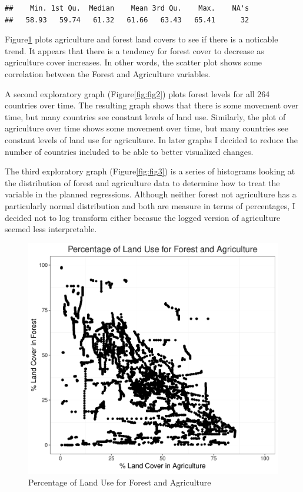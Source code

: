 \documentclass[12pt,]{article}
\begin{document}
\begin{verbatim}
##    Min. 1st Qu.  Median    Mean 3rd Qu.    Max.    NA's 
##   58.93   59.74   61.32   61.66   63.43   65.41      32
\end{verbatim}

Figure\ref{fig:fig1} plots agriculture and forest land covers to see if
there is a noticable trend. It appears that there is a tendency for
forest cover to decrease as agriculture cover increases. In other words,
the scatter plot shows some correlation between the Forest and
Agriculture variables.

A second exploratory graph (Figure\ref{fig:fig2}) plots forest levels
for all 264 countries over time. The resulting graph shows that there is
some movement over time, but many countries see constant levels of land
use. Similarly, the plot of agriculture over time shows some movement
over time, but many countries see constant levels of land use for
agriculture. In later graphs I decided to reduce the number of countries
included to be able to better visualized changes.

The third exploratory graph (Figure\ref{fig:fig3}) is a series of
histograms looking at the distribution of forest and agriculture data to
determine how to treat the variable in the planned regressions. Although
neither forest not agriculture has a particularly normal distribution
and both are measure in terms of percentages, I decided not to log
transform either becasue the logged version of agriculture seemed less
interpretable.

\begin{figure}
\centering
\includegraphics{Marx_ENV872_Project_files/figure-latex/fig1-1.pdf}
\caption{\label{fig:fig1}Percentage of Land Use for Forest and
Agriculture}
\end{figure}
\end{document}
